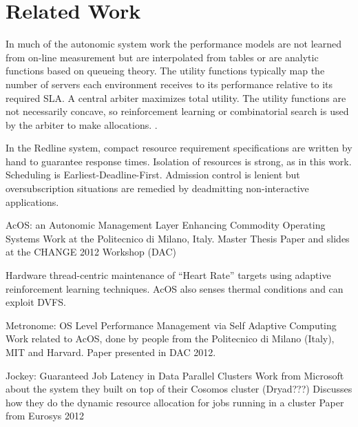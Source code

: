 \section{Related Work}

%	
%
%	
%
In much of the autonomic system work\cite{1078472,1078493,1285843,1345325}
the performance models are not learned from on-line measurement but are
interpolated from tables or are analytic functions based on queueing theory.
The utility functions typically map the number of servers each environment receives
to its performance relative to its required SLA.
A central arbiter maximizes total utility. The utility functions are not necessarily concave,
so reinforcement learning or combinatorial search is used by the arbiter to make allocations. .

%
In the Redline system\cite{Redline}, compact resource requirement specifications are written by hand to guarantee response times.
Isolation of resources is strong, as in this work.  Scheduling is Earliest-Deadline-First.
Admission control is lenient but oversubscription situations are remedied by deadmitting non-interactive applications.

AcOS: an Autonomic Management Layer Enhancing Commodity Operating Systems \cite{AcOS}
Work at the Politecnico di Milano, Italy.
Master Thesis
Paper and slides at the CHANGE 2012 Workshop (DAC)

Hardware thread-centric maintenance of ``Heart Rate'' targets using adaptive reinforcement learning techniques.
AcOS also senses thermal conditions and can exploit DVFS.

Metronome: OS Level Performance Management via Self Adaptive Computing \cite{Metronome}
Work related to AcOS, done by people from the Politecnico di Milano (Italy), MIT and Harvard.
Paper presented in DAC 2012.

Jockey: Guaranteed Job Latency in Data Parallel Clusters \cite{Jockey}
Work from Microsoft about the system they built on top of their Cosomos cluster (Dryad???)
Discusses how they do the dynamic resource allocation for jobs running in a cluster
Paper from Eurosys 2012


